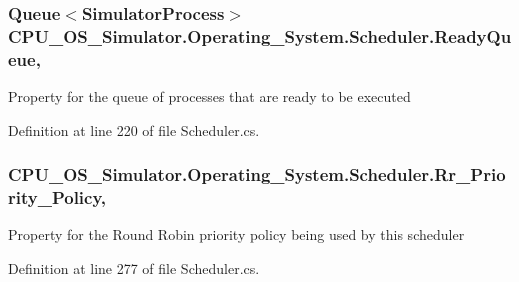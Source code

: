 \subsubsection[{Ready\+Queue}]{\setlength{\rightskip}{0pt plus 5cm}Queue$<${\bf Simulator\+Process}$>$ C\+P\+U\+\_\+\+O\+S\+\_\+\+Simulator.\+Operating\+\_\+\+System.\+Scheduler.\+Ready\+Queue\hspace{0.3cm}{\ttfamily [get]}, {\ttfamily [set]}}\label{class_c_p_u___o_s___simulator_1_1_operating___system_1_1_scheduler_a7f0cc5668527496de0028013dae3be0c}


Property for the queue of processes that are ready to be executed 



Definition at line 220 of file Scheduler.\+cs.

\hypertarget{class_c_p_u___o_s___simulator_1_1_operating___system_1_1_scheduler_aadb6b79c667cfd6baef113c44fb98f9e}{}
\subsubsection[{Rr\+\_\+\+Priority\+\_\+\+Policy}]{ C\+P\+U\+\_\+\+O\+S\+\_\+\+Simulator.\+Operating\+\_\+\+System.\+Scheduler.\+Rr\+\_\+\+Priority\+\_\+\+Policy\hspace{0.3cm}{\ttfamily [get]}, {\ttfamily [set]}}\label{class_c_p_u___o_s___simulator_1_1_operating___system_1_1_scheduler_aadb6b79c667cfd6baef113c44fb98f9e}


Property for the Round Robin priority policy being used by this scheduler 



Definition at line 277 of file Scheduler.\+cs.

\hypertarget{class_c_p_u___o_s___simulator_1_1_operating___system_1_1_scheduler_ab21e8ffe8d0f06388cc2310d3dbb3b48}{}
